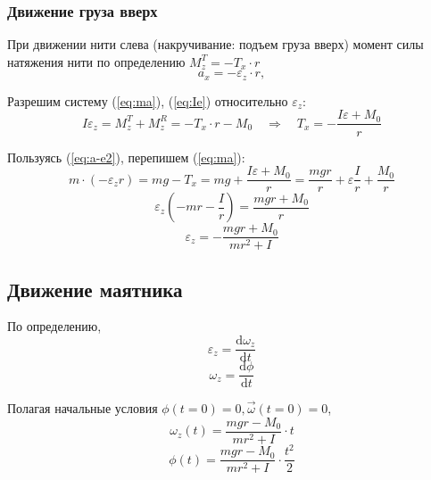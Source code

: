 \documentclass[a4paper,12pt]{article}
\begin{document}
\subsubsection{Движение груза вверх} %

При движении нити слева (накручивание: подъем груза вверх) момент силы натяжения нити по определению $M_z^{T}=-T_x\cdot r$
\begin{equation}
	\label{eq:a-e2}
	a_x=-\varepsilon_z\cdot r,
\end{equation}   

Разрешим систему (\ref{eq:ma}), (\ref{eq:Ie}) относительно $\varepsilon_z$:
\begin{equation}
	I\varepsilon_z=M_z^{T}+M_z^{R}=-T_x\cdot r -M_0\quad \Rightarrow \quad
	T_x=-\frac{I \varepsilon + M_0}{r}
\end{equation}

Пользуясь (\ref{eq:a-e2}), перепишем (\ref{eq:ma}):
\begin{equation}
	m\cdot (-\varepsilon_z r) = mg - T_x = mg + \frac{I \varepsilon + M_0}{r}=\frac{mgr}{r}+\varepsilon\frac{I}{r}+\frac{M_0}{r}
\end{equation}
\begin{equation}
	\varepsilon_z(-mr-\frac{I}{r})=\frac{mgr+M_0}{r}
\end{equation}
\begin{equation}
	\label{eq:e+t}
	\varepsilon_z=-\frac{mgr+M_0}{mr^2+I}
\end{equation}



\subsection{Движение маятника} %

По определению, 
\begin{equation}
	\varepsilon_z=\frac{\mathrm d\omega_z}{\mathrm dt}
\end{equation}
\begin{equation}
	\omega_z=\frac{\mathrm d\phi}{\mathrm dt}
\end{equation}

Полагая начальные условия $\phi(t=0)=0, \vec\omega(t=0)=0$,
\begin{equation}
	\label{eq:omega-t}
	\omega_z(t)=\frac{mgr-M_0}{mr^2+I}\cdot t
\end{equation}
\begin{equation}
	\label{eq:phi-t}
	\phi(t)=\frac{mgr-M_0}{mr^2+I}\cdot \frac{t^2}{2}
\end{equation}
\end{document}
